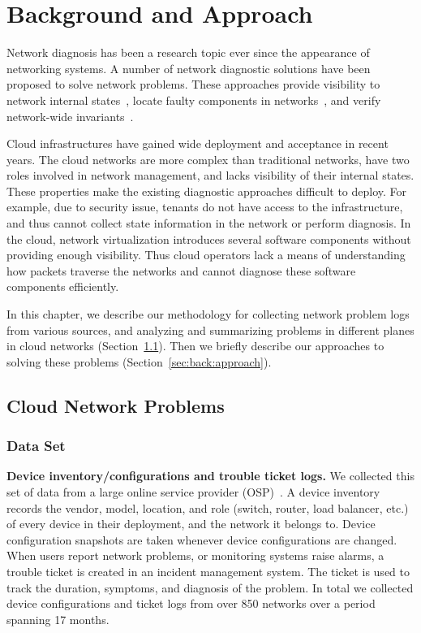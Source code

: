 \chapter{Background and Approach}
\label{chap:background}

Network diagnosis has been a research topic ever since the appearance of networking systems. 
A number of network diagnostic solutions have been proposed to solve network problems. 
These approaches provide visibility to network internal states~\cite{sflow, netflow, ndb, ofrewind}, 
locate faulty components in networks~\cite{snap, xtrace, netdiagnoser}, 
and verify network-wide invariants~\cite{veriflow, hsa, anteater}.

Cloud infrastructures have gained wide deployment and acceptance in recent years. The cloud networks are more complex than traditional networks, have two roles involved in network management, and lacks visibility of their internal states. These properties make the existing diagnostic approaches difficult to deploy. For example, due to security issue, tenants do not have access to the infrastructure, and thus cannot collect state information in the network or perform diagnosis. In the cloud, network virtualization introduces several software components without providing enough visibility. Thus cloud operators lack a means of understanding how packets traverse the networks and cannot diagnose these software components efficiently.

In this chapter, we describe our methodology for collecting network problem logs from various sources, and analyzing and summarizing problems in different planes in cloud networks (Section~\ref{sec:back:data}). Then we briefly describe our approaches to solving these problems (Section~\ref{sec:back:approach}). 

\section{Cloud Network Problems}
\label{sec:back:data}
\subsection{Data Set}
{\bf Device inventory/configurations and trouble ticket logs.}
We collected this set of data from a large online service provider (OSP)~\cite{mpa}. A device inventory records the vendor, model, location, and role (switch, router, load balancer, etc.) of every device in their deployment, and the network it belongs to. Device configuration snapshots are taken whenever device configurations are changed. When users report network problems, or monitoring systems raise alarms, a trouble ticket is created in an incident management system. The ticket is used to track the duration, symptoms, and diagnosis of the problem. In total we collected device configurations and ticket logs from over 850 networks over a period spanning 17 months.

